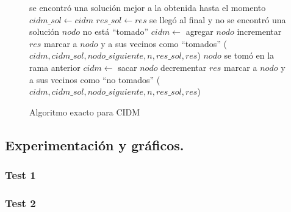 \begin{figure}
\begin{codebox}
\li \If se encontró una solución mejor a la obtenida hasta el momento
\li \Then 
 		$cidm\_sol \leftarrow cidm$
\li 		$res\_sol \leftarrow res$ 		
\li 		\Return
	\End
\li \If se llegó al final y no se encontró una solución
\li \Then \Return
	\End
\li \If $nodo$ no está ``tomado''	
\li \Then
		$cidm \leftarrow$ agregar $nodo$
\li 		incrementar $res$
\li 		marcar a $nodo$ y a sus vecinos como ``tomados''
($cidm,cidm\_sol,nodo\_siguiente,n,res\_sol,res$)
	\End
\li 	\If $nodo$ se tomó en la rama anterior
\li 	\Then
		$cidm \leftarrow$ sacar $nodo$
\li		decrementar $res$
\li 		marcar a $nodo$ y a sus vecinos como ``no tomados''
	\End
{}($cidm,cidm\_sol,nodo\_siguiente,n,res\_sol,res$)
\end{codebox}
\caption{Algoritmo exacto para CIDM}\label{code:exacto}
\end{figure}

\vspace*{0.6cm}
\subsection{Experimentación y gráficos.}

\vspace*{0.3cm}


\subsubsection{Test 1}
\vspace*{0.3cm}

\vspace*{0.6cm}

\subsubsection{Test 2}

